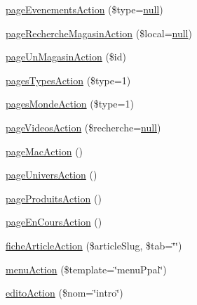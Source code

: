 \begin{DoxyCompactItemize}
\hyperlink{class_acme_group_1_1_site_bundle_1_1_controller_1_1_site_controller_a30080b1747f7c2de2e49978895e847a3}{page\+Evenements\+Action} (\$type=\hyperlink{validate_8js_afb8e110345c45e74478894341ab6b28e}{null})
\item 
\hyperlink{class_acme_group_1_1_site_bundle_1_1_controller_1_1_site_controller_ad880dc386b2f968aeb4265fc8d5e556f}{page\+Recherche\+Magasin\+Action} (\$local=\hyperlink{validate_8js_afb8e110345c45e74478894341ab6b28e}{null})
\item 
\hyperlink{class_acme_group_1_1_site_bundle_1_1_controller_1_1_site_controller_a09b737d54c648c1fb226d93757caade1}{page\+Un\+Magasin\+Action} (\$id)
\item 
\hyperlink{class_acme_group_1_1_site_bundle_1_1_controller_1_1_site_controller_a449c8a03624d2aefb0e69726115b6caf}{pages\+Types\+Action} (\$type=1)
\item 
\hyperlink{class_acme_group_1_1_site_bundle_1_1_controller_1_1_site_controller_a25b5374057978d34e73dbe5e8b5c91e9}{pages\+Monde\+Action} (\$type=1)
\item 
\hyperlink{class_acme_group_1_1_site_bundle_1_1_controller_1_1_site_controller_af5bf16b951661eb752a905569c710314}{page\+Videos\+Action} (\$recherche=\hyperlink{validate_8js_afb8e110345c45e74478894341ab6b28e}{null})
\item 
\hyperlink{class_acme_group_1_1_site_bundle_1_1_controller_1_1_site_controller_ab85faa8e5800bc78748a07f3f9f8cc1c}{page\+Mac\+Action} ()
\item 
\hyperlink{class_acme_group_1_1_site_bundle_1_1_controller_1_1_site_controller_ae90ee43189836cb7c049ce0a5ded8b15}{page\+Univers\+Action} ()
\item 
\hyperlink{class_acme_group_1_1_site_bundle_1_1_controller_1_1_site_controller_a1138720992b551fd22a639a5237546ed}{page\+Produits\+Action} ()
\item 
\hyperlink{class_acme_group_1_1_site_bundle_1_1_controller_1_1_site_controller_a0355624f49fa4794f7417daf7fc68e50}{page\+En\+Cours\+Action} ()
\item 
\hyperlink{class_acme_group_1_1_site_bundle_1_1_controller_1_1_site_controller_a8b7c46e73ad1dd71e192472b00fcedcc}{fiche\+Article\+Action} (\$article\+Slug, \$tab=\char`\"{}\char`\"{})
\item 
\hyperlink{class_acme_group_1_1_site_bundle_1_1_controller_1_1_site_controller_a8701f582451c39d462286396531f9643}{menu\+Action} (\$template=\char`\"{}menu\+Ppal\char`\"{})
\item 
\hyperlink{class_acme_group_1_1_site_bundle_1_1_controller_1_1_site_controller_a32f47e7de6bc30fb2d65e18e892eacc8}{edito\+Action} (\$nom=\char`\"{}intro\char`\"{})

\end{DoxyCompactItemize}
